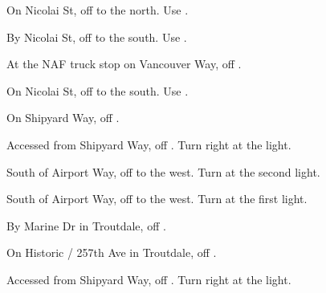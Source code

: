 

\begin{LocationList}

On Nicolai St, off  to the north. Use  .

By Nicolai St, off  to the south. Use  .

At the NAF truck stop on Vancouver Way, off  .

\Location{\GarageHQ \Garage}
On Nicolai St, off  to the south. Use  .

On Shipyard Way, off  .

Accessed from Shipyard Way, off  . Turn right at the light.

South of Airport Way, off   to the west. Turn at the second light.

South of Airport Way, off   to the west. Turn at the first light.

By Marine Dr in Troutdale, off  .

On Historic  / 257th Ave in Troutdale, off  .

Accessed from Shipyard Way, off  . Turn right at the light.

\end{LocationList}
